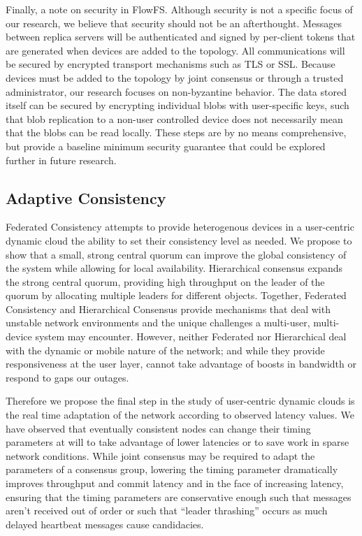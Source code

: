 \documentclass{article}
\begin{document}
Finally, a note on security in FlowFS. Although security is not a specific focus of our research, we believe that security should not be an afterthought. Messages between replica servers will be authenticated and signed by per-client tokens that are generated when devices are added to the topology. All communications will be secured by encrypted transport mechanisms such as TLS or SSL. Because devices must be added to the topology by joint consensus or through a trusted administrator, our research focuses on non-byzantine behavior. The data stored itself can be secured by encrypting individual blobs with user-specific keys, such that blob replication to a non-user controlled device does not necessarily mean that the blobs can be read locally. These steps are by no means comprehensive, but provide a baseline minimum security guarantee that could be explored further in future research.

\subsection{Adaptive Consistency}
\label{sec:adaptive}

Federated Consistency attempts to provide heterogenous devices in a user-centric dynamic cloud the ability to set their consistency level as needed. We propose to show that a small, strong central quorum can improve the global consistency of the system while allowing for local availability. Hierarchical consensus expands the strong central quorum, providing high throughput on the leader of the quorum by allocating multiple leaders for different objects. Together, Federated Consistency and Hierarchical Consensus provide mechanisms that deal with unstable network environments and the unique challenges a multi-user, multi-device system may encounter. However, neither Federated nor Hierarchical deal with the dynamic or mobile nature of the network; and while they provide responsiveness at the user layer, cannot take advantage of boosts in bandwidth or respond to gaps our outages.

Therefore we propose the final step in the study of user-centric dynamic clouds is the real time adaptation of the network according to observed latency values. We have observed that eventually consistent nodes can change their timing parameters at will to take advantage of lower latencies or to save work in sparse network conditions. While joint consensus may be required to adapt the parameters of a consensus group, lowering the timing parameter dramatically improves throughput and commit latency and in the face of increasing latency, ensuring that the timing parameters are conservative enough such that messages aren't received out of order or such that ``leader thrashing'' occurs as much delayed heartbeat messages cause candidacies.
\end{document}
